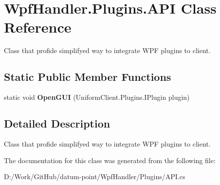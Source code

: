 \hypertarget{class_wpf_handler_1_1_plugins_1_1_a_p_i}{}\section{Wpf\+Handler.\+Plugins.\+A\+PI Class Reference}
\label{class_wpf_handler_1_1_plugins_1_1_a_p_i}


Class that profide simplifyed way to integrate W\+PF plugins to client.  


\subsection*{Static Public Member Functions}
\begin{DoxyCompactItemize}
\item 
\mbox{\label{class_wpf_handler_1_1_plugins_1_1_a_p_i_ab5fa2212cf7d00290d86c0aa5bc65f91}} 
static void {\bfseries Open\+G\+UI} (Uniform\+Client.\+Plugins.\+I\+Plugin plugin)
\end{DoxyCompactItemize}


\subsection{Detailed Description}
Class that profide simplifyed way to integrate W\+PF plugins to client. 



The documentation for this class was generated from the following file\+:\begin{DoxyCompactItemize}
\item 
D\+:/\+Work/\+Git\+Hub/datum-\/point/\+Wpf\+Handler/\+Plugins/A\+P\+I.\+cs\end{DoxyCompactItemize}
